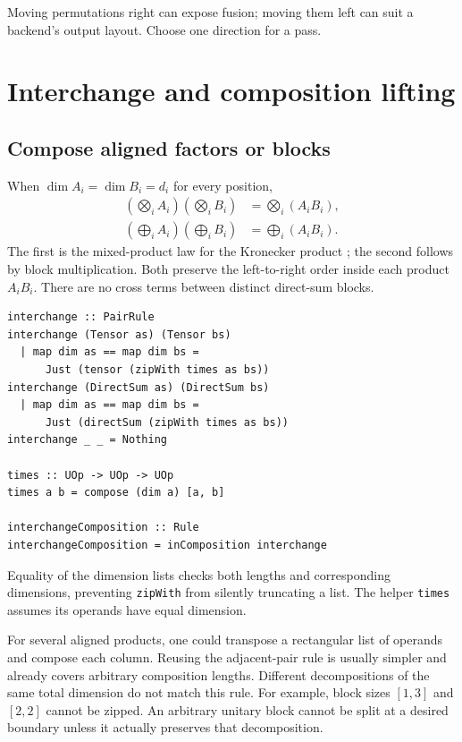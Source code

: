 \documentclass[11pt,a4paper]{article}
\newcommand{\code}[1]{\texttt{#1}}
\begin{document}
Moving permutations right can expose fusion; moving them left can suit
a backend's output layout. Choose one direction for a pass.

\section{Interchange and composition lifting}

\subsection{Compose aligned factors or blocks}

When $\dim A_i=\dim B_i=d_i$ for every position,
\begin{align}
 \left(\bigotimes_i A_i\right)
 \left(\bigotimes_i B_i\right)
   &=\bigotimes_i(A_iB_i), \label{eq:tensor-interchange}\\
 \left(\bigoplus_i A_i\right)
 \left(\bigoplus_i B_i\right)
   &=\bigoplus_i(A_iB_i). \label{eq:sum-interchange}
\end{align}
The first is the mixed-product law for the Kronecker product
\cite{higham-kron}; the second follows by block multiplication.
Both preserve the left-to-right order inside each product $A_iB_i$.
There are no cross terms between distinct direct-sum blocks.

\begin{lstlisting}
interchange :: PairRule
interchange (Tensor as) (Tensor bs)
  | map dim as == map dim bs =
      Just (tensor (zipWith times as bs))
interchange (DirectSum as) (DirectSum bs)
  | map dim as == map dim bs =
      Just (directSum (zipWith times as bs))
interchange _ _ = Nothing

times :: UOp -> UOp -> UOp
times a b = compose (dim a) [a, b]

interchangeComposition :: Rule
interchangeComposition = inComposition interchange
\end{lstlisting}

Equality of the dimension lists checks both lengths and corresponding
dimensions, preventing \code{zipWith} from silently truncating a list.
The helper \code{times} assumes its operands have equal dimension.

For several aligned products, one could transpose a rectangular list
of operands and compose each column. Reusing the adjacent-pair rule is
usually simpler and already covers arbitrary composition lengths.
Different decompositions of the same total dimension do not match this
rule. For example, block sizes $[1,3]$ and $[2,2]$ cannot be zipped.
An arbitrary unitary block cannot be split at a desired boundary unless
it actually preserves that decomposition.
\end{document}

